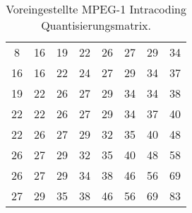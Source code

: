 
\begin{table}
\centering
\begin{tabular}{|c|c|c|c|c|c|c|c|}
	\hline
	8 & 16 & 19 & 22 & 26 & 27 & 29 & 34 \\
	16 & 16 & 22 & 24 & 27 & 29 & 34 & 37 \\
	19 & 22 & 26 & 27 & 29 & 34 & 34 & 38 \\
	22 & 22 & 26 & 27 & 29 & 34 & 37 & 40 \\
	22 & 26 & 27 & 29 & 32 & 35 & 40 & 48 \\
	26 & 27 & 29 & 32 & 35 & 40 & 48 & 58 \\
	26 & 27 & 29 & 34 & 38 & 46 & 56 & 69 \\
	27 & 29 & 35 & 38 & 46 & 56 & 69 & 83 \\
	\hline
\end{tabular}
\caption{Voreingestellte MPEG-1 Intracoding Quantisierungsmatrix. \cite{symes_peter_digital_2004} }
\label{tab:default_quant}
\end{table}

